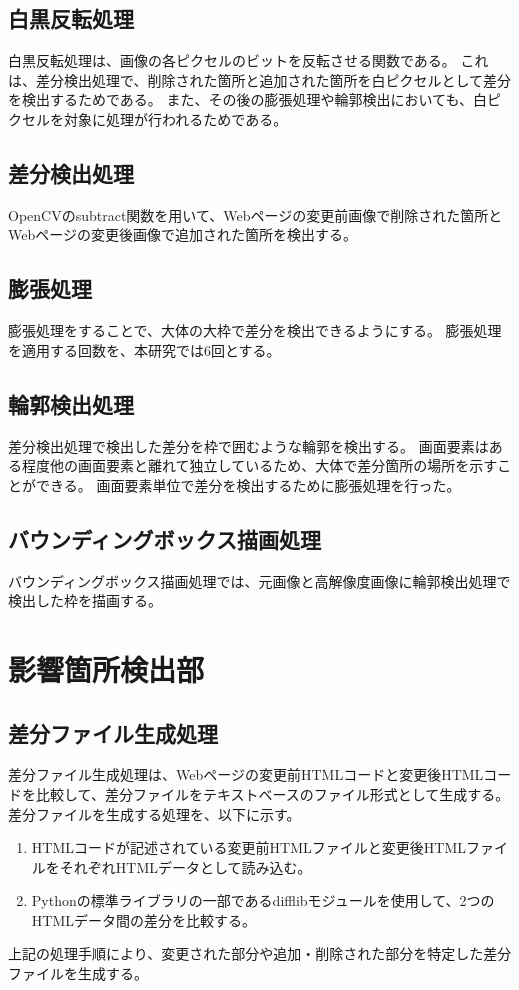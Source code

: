 \subsection{白黒反転処理}\label{subsec:reverse}
白黒反転処理は、画像の各ピクセルのビットを反転させる関数である。
これは、差分検出処理で、削除された箇所と追加された箇所を白ピクセルとして差分を検出するためである。
また、その後の膨張処理や輪郭検出においても、白ピクセルを対象に処理が行われるためである。

\subsection{差分検出処理}\label{subsec:difference_detection_process}
OpenCVのsubtract関数を用いて、Webページの変更前画像で削除された箇所とWebページの変更後画像で追加された箇所を検出する。

\subsection{膨張処理}\label{subsec:dilation}
膨張処理をすることで、大体の大枠で差分を検出できるようにする。
膨張処理を適用する回数を、本研究では6回とする。

\subsection{輪郭検出処理}\label{subsec:contour_detection_processing}
差分検出処理で検出した差分を枠で囲むような輪郭を検出する。
画面要素はある程度他の画面要素と離れて独立しているため、大体で差分箇所の場所を示すことができる。
画面要素単位で差分を検出するために膨張処理を行った。

\subsection{バウンディングボックス描画処理}\label{subsec:Bounding box drawing process}
バウンディングボックス描画処理では、元画像と高解像度画像に輪郭検出処理で検出した枠を描画する。


\section{影響箇所検出部}\label{sec:Affected_area_extraction}

\subsection{差分ファイル生成処理}\label{subsec:diff_file_generate}
差分ファイル生成処理は、Webページの変更前HTMLコードと変更後HTMLコードを比較して、差分ファイルをテキストベースのファイル形式として生成する。
差分ファイルを生成する処理を、以下に示す。
\begin{enumerate}
    \item HTMLコードが記述されている変更前HTMLファイルと変更後HTMLファイルをそれぞれHTMLデータとして読み込む。
    \item Pythonの標準ライブラリの一部であるdifflibモジュールを使用して、2つのHTMLデータ間の差分を比較する。
\end{enumerate}
上記の処理手順により、変更された部分や追加・削除された部分を特定した差分ファイルを生成する。

